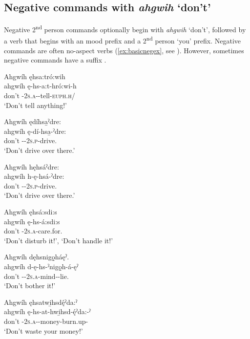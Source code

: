 \subsection{Negative commands with \textit{ahgwih} ‘don’t’} \label{Negative commands with [ahgwih] ‘don’t’}
Negative 2\textsuperscript{nd} person commands optionally begin with \textit{ahgwih} ‘don’t’, followed by a verb that begins with an  {\future} mood prefix and a 2\textsuperscript{nd} person ‘you’ prefix. Negative commands are often no-aspect verbs (\ref{ex:basicnegex}, see ). However, sometimes negative commands have a  {\punctual} suffix .

\ea\label{ex:basicnegex} 
\ea Ahgwíh ęhsa:tró:wih\\
\gll ahgwíh ę-hs-a:t-hró:wi-h \\
don’t \fut-\textsc{2s.a}-{\semireflexive}-tell-\textsc{euph.h}/{\noaspect}\\
\glt ‘Don’t tell anything!’ 

\ex Ahgwíh ędíhsa̱ˀdre: \\
\gll ahgwíh ę-dí-hsa̱-ˀdre:\\ 
don’t \fut-{\cislocative}-\textsc{2s.p}-drive.{\noaspect}\\
\glt ‘Don’t drive over there.’ 

\ex Ahgwíh hęhsáˀdre: \\
\gll ahgwíh h-ę-hsá-ˀdre: \\
don’t {\translocative}-{\future}-\textsc{2s.p}-drive.{\noaspect}\\
\glt ‘Don’t drive over there.’ 


\ex Ahgwíh ęhsá:sdi:s \\
\gll ahgwíh ę-hs-á:sdi:s \\
don’t \fut-\textsc{2s.a}-care.for.{\noaspect}\\
\glt ‘Don’t disturb it!’, ‘Don’t handle it!’ 
\z
\z

\ea\label{ex:basicnegex2} 
\ea Ahgwíh dęhsnigǫ̱háęˀ.\\
\gll ahgwíh d-ę-hs-ˀnigǫ̱h-á-ęˀ \\
don’t {\dualic}-{\future}-\textsc{2s.a}-mind-{\joinerA}-lie.{\zeropunctual}\\
\glt ‘Don’t bother it!’ 


\ex Ahgwíh ęhsatwi̱hsdę́ˀda:ˀ \\
\gll ahgwíh ę-hs-at-hwi̱hsd-ę́ˀda:-ˀ\\
don’t \fut-\textsc{2s.a}-{\semireflexive}-money-burn.up-{\punctual}\\
\glt ‘Don’t waste your money!’ 
\z
\z

